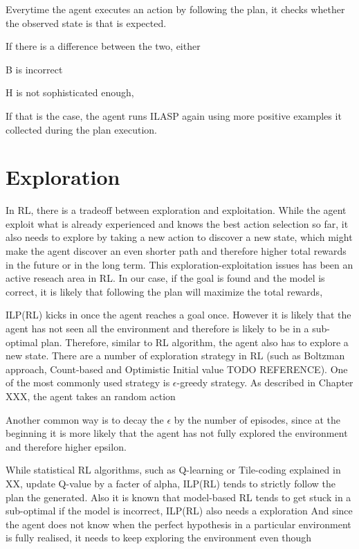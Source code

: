 
Everytime the agent executes an action by following the plan, it checks whether the observed state is that is expected.

If there is a difference between the two, either

B is incorrect

H is not sophisticated enough,

If that is the case, the agent runs ILASP again using more positive examples it collected during the plan execution.

\section{Exploration}
\label{exploration}

In RL, there is a tradeoff between exploration and exploitation. While the agent exploit what is already experienced and knows the best action selection so far, 
it also needs to explore by taking a new action to discover a new state, which might make the agent discover an even shorter path and therefore higher total rewards in the future or in the long term. 
This exploration-exploitation issues has been an active reseach area in RL. 
In our case, if the goal is found and the model is correct, it is likely that following the plan will maximize the total rewards, 

ILP(RL) kicks in once the agent reaches a goal once. However it is likely that the agent has not seen all the environment
and therefore is likely to be in a sub-optimal plan. Therefore, similar to RL algorithm, the agent also has to explore a new state.
There are a number of exploration strategy in RL (such as Boltzman approach, Count-based and Optimistic Initial value TODO REFERENCE).
One of the most commonly used strategy is $\epsilon$-greedy strategy. As described in Chapter XXX, the agent takes an random action

Another common way is to decay the $\epsilon$ by the number of episodes, since at the beginning it is more likely that the agent has not fully explored the environment and therefore higher epsilon.



While statistical RL algorithms, such as Q-learning or Tile-coding explained in XX, update Q-value by a facter of alpha, 
ILP(RL) tends to strictly follow the plan the generated. Also it is known that model-based RL tends to get stuck in a sub-optimal if the model is incorrect, ILP(RL) also needs a exploration
And since the agent does not know when the perfect hypothesis in a particular environment is fully realised, it needs to keep exploring the environment even though



